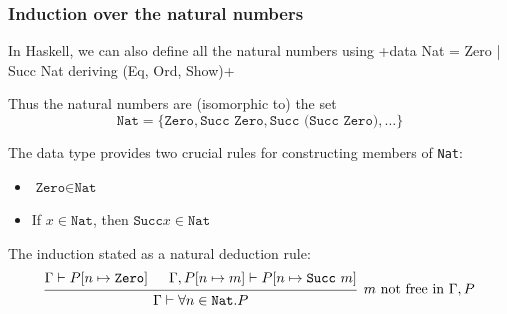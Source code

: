 \subsubsection{Induction over the natural numbers}
In Haskell, we can also define all the natural numbers using
+data Nat = Zero | Succ Nat deriving (Eq, Ord, Show)+

Thus the natural numbers are (isomorphic to) the set
\[
    \texttt{Nat} = \{ \texttt{Zero}, \texttt{Succ Zero}, \texttt{Succ (Succ Zero)}, \ldots \}
\]

The data type provides two crucial rules for constructing members of \texttt{Nat}:
\begin{itemize}
    \item $\texttt{Zero} \in \texttt{Nat}$
    \item If $x \in \texttt{Nat}$, then $\texttt{Succ} x \in \texttt{Nat}$
\end{itemize}

The induction stated as a natural deduction rule:
\[
    \begin{prooftree}
        \hypo{\Gamma \vdash P[n \mapsto \texttt{Zero}]}
        \hypo{\Gamma, P[n \mapsto m] \vdash P[n \mapsto \texttt{Succ}\ m]}
        \infer2[$m$ not free in $\Gamma, P$]{\Gamma \vdash \forall n \in \texttt{Nat}. P}
    \end{prooftree}
\]
